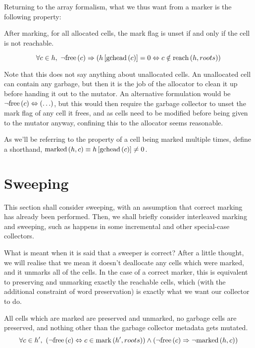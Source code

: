 Returning to the array formalism, what we thus want from a marker is
the following property:

\begin{definition}
  \label{def:ms-correct-marking}
  After marking, for all allocated cells, the mark flag is unset if
  and only if the cell is not reachable.

  \[\forall c \in h,\ \lnot\mathrm{free}\left(c\right) \Rightarrow
  \left(h\left[\mathrm{gchead}\left(c\right)\right] = 0 \Leftrightarrow c \notin
    \mathrm{reach}\left(h, roots\right)\right)\]
\end{definition}

Note that this does not say anything about unallocated cells. An
unallocated cell can contain any garbage, but then it is the job of
the allocator to clean it up before handing it out to the mutator. An
alternative formulation would be $\lnot\mathrm{free}\left(c\right) \Leftrightarrow
\left(\ldots\right)$, but this would then require the garbage
collector to unset the mark flag of any cell it frees, and as cells
need to be modified before being given to the mutator anyway,
confining this to the allocator seems reasonable.

As we'll be referring to the property of a cell being marked multiple
times, define a shorthand, $\mathrm{marked}\left(h, c\right) \equiv
h\left[\mathrm{gchead}\left(c\right)\right] \neq 0$.

\section{Sweeping}
\label{sec:marksweep-sweeping}

This section shall consider sweeping, with an assumption that correct
marking has already been performed. Then, we shall briefly consider
interleaved marking and sweeping, such as happens in some incremental
and other special-case collectors.

What is meant when it is said that a sweeper is correct? After a
little thought, we will realise that we mean it doesn't deallocate any
cells which were marked, and it unmarks all of the cells. In the case
of a correct marker, this is equivalent to preserving and unmarking
exactly the reachable cells, which (with the additional constraint of
word preservation) is exactly what we want our collector to do.

\begin{definition}
  \label{def:ms-correct-sweeping}
  All cells which are marked are preserved and unmarked, no garbage
  cells are preserved, and nothing other than the garbage collector
  metadata gets mutated.
  \[\forall c \in h',\ \left(\lnot\mathrm{free}\left(c\right) \Leftrightarrow c \in
    \mathrm{mark}\left(h', roots\right)\right) \land \left(\lnot\mathrm{free}\left(c\right) \Rightarrow
    \lnot\mathrm{marked}\left(h, c\right)\right)\]
\end{definition}

